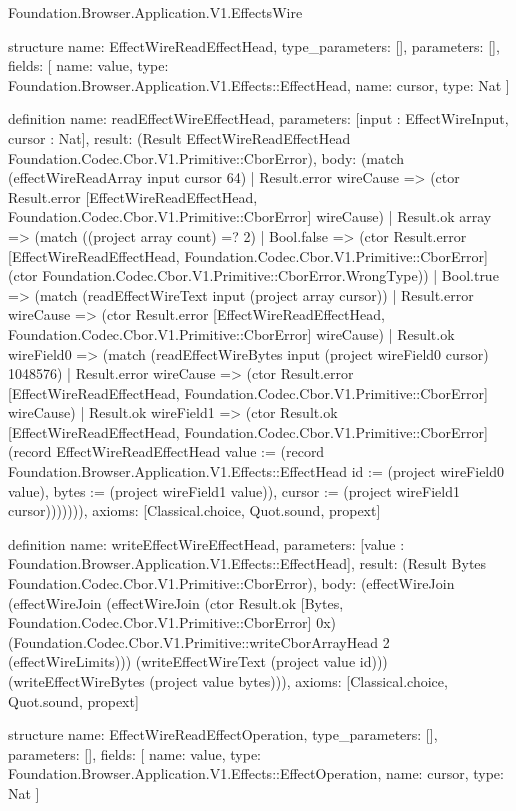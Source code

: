 \begin{lexlean}{Foundation.Browser.Application.V1.EffectsWire}
\begin{semanticmodule}
structure{
  name: EffectWireReadEffectHead,
  type_parameters: [],
  parameters: [],
  fields: [
    {name: value, type: Foundation.Browser.Application.V1.Effects::EffectHead},
    {name: cursor, type: Nat}
  ]
}

definition{
  name: readEffectWireEffectHead,
  parameters: [input : EffectWireInput, cursor : Nat],
  result: (Result EffectWireReadEffectHead Foundation.Codec.Cbor.V1.Primitive::CborError),
  body: (match (effectWireReadArray input cursor 64)
    | Result.error wireCause => (ctor Result.error [EffectWireReadEffectHead, Foundation.Codec.Cbor.V1.Primitive::CborError] wireCause)
    | Result.ok array => (match ((project array count) =? 2)
      | Bool.false => (ctor Result.error [EffectWireReadEffectHead, Foundation.Codec.Cbor.V1.Primitive::CborError] (ctor Foundation.Codec.Cbor.V1.Primitive::CborError.WrongType))
      | Bool.true => (match (readEffectWireText input (project array cursor))
        | Result.error wireCause => (ctor Result.error [EffectWireReadEffectHead, Foundation.Codec.Cbor.V1.Primitive::CborError] wireCause)
        | Result.ok wireField0 => (match (readEffectWireBytes input (project wireField0 cursor) 1048576)
          | Result.error wireCause => (ctor Result.error [EffectWireReadEffectHead, Foundation.Codec.Cbor.V1.Primitive::CborError] wireCause)
          | Result.ok wireField1 => (ctor Result.ok [EffectWireReadEffectHead, Foundation.Codec.Cbor.V1.Primitive::CborError] (record EffectWireReadEffectHead {value := (record Foundation.Browser.Application.V1.Effects::EffectHead {id := (project wireField0 value), bytes := (project wireField1 value)}), cursor := (project wireField1 cursor)})))))),
  axioms: [Classical.choice, Quot.sound, propext]
}

definition{
  name: writeEffectWireEffectHead,
  parameters: [value : Foundation.Browser.Application.V1.Effects::EffectHead],
  result: (Result Bytes Foundation.Codec.Cbor.V1.Primitive::CborError),
  body: (effectWireJoin (effectWireJoin (effectWireJoin (ctor Result.ok [Bytes, Foundation.Codec.Cbor.V1.Primitive::CborError] 0x) (Foundation.Codec.Cbor.V1.Primitive::writeCborArrayHead 2 (effectWireLimits))) (writeEffectWireText (project value id))) (writeEffectWireBytes (project value bytes))),
  axioms: [Classical.choice, Quot.sound, propext]
}

structure{
  name: EffectWireReadEffectOperation,
  type_parameters: [],
  parameters: [],
  fields: [
    {name: value, type: Foundation.Browser.Application.V1.Effects::EffectOperation},
    {name: cursor, type: Nat}
  ]
}


\end{semanticmodule}
\end{lexlean}
